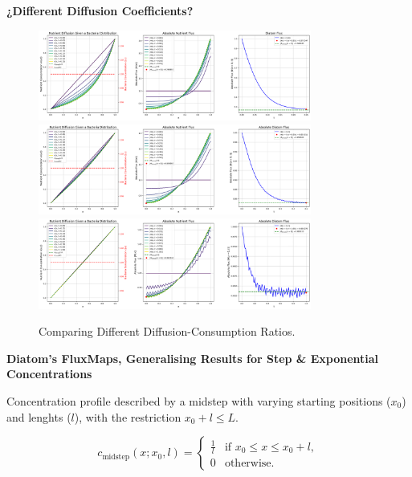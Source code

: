 \textbf{ \color{red} ¿Different Diffusion Coefficients?}

\begin{figure}[H]
    \centering
    \includegraphics[width=0.8\textwidth]{Figures/Diff_Dom.png}
    \includegraphics[width=0.8\textwidth]{Figures/Diff~Consump.png}
    \includegraphics[width=0.8\textwidth]{Figures/Consump_Dom.png}
    \caption{Comparing Different Diffusion-Consumption Ratios.}
    \label{fig:Diff_Consump}
\end{figure}

\textbf{Diatom's FluxMaps, Generalising Results for Step \& Exponential Concentrations}

Concentration profile described by a midstep with varying starting positions ($x_0$) and lenghts ($l$), with the restriction $x_0 + l \leq L$.

\begin{equation}
    c_{\text{midstep}}(x; x_0,l) = 
    \begin{cases} 
    \frac{1}{l} & \text{if } x_0 \leq x \leq x_0 + l, \\
    0 & \text{otherwise}.
    \end{cases}
\end{equation}

